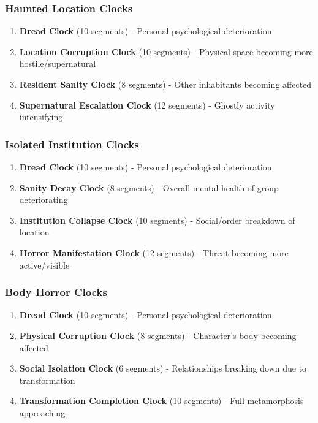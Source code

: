 \documentclass[11pt]{article}
\begin{document}
\subsubsection{Haunted Location Clocks}
\begin{enumerate}
\item \textbf{Dread Clock} (10 segments) - Personal psychological deterioration
\item \textbf{Location Corruption Clock} (10 segments) - Physical space becoming more hostile/supernatural
\item \textbf{Resident Sanity Clock} (8 segments) - Other inhabitants becoming affected
\item \textbf{Supernatural Escalation Clock} (12 segments) - Ghostly activity intensifying
\end{enumerate}

\subsubsection{Isolated Institution Clocks}
\begin{enumerate}
\item \textbf{Dread Clock} (10 segments) - Personal psychological deterioration
\item \textbf{Sanity Decay Clock} (8 segments) - Overall mental health of group deteriorating
\item \textbf{Institution Collapse Clock} (10 segments) - Social/order breakdown of location
\item \textbf{Horror Manifestation Clock} (12 segments) - Threat becoming more active/visible
\end{enumerate}

\subsubsection{Body Horror Clocks}
\begin{enumerate}
\item \textbf{Dread Clock} (10 segments) - Personal psychological deterioration
\item \textbf{Physical Corruption Clock} (8 segments) - Character's body becoming affected
\item \textbf{Social Isolation Clock} (6 segments) - Relationships breaking down due to transformation
\item \textbf{Transformation Completion Clock} (10 segments) - Full metamorphosis approaching
\end{enumerate}
\end{document}
